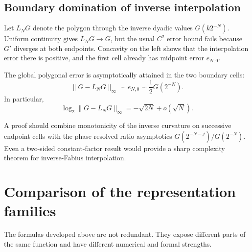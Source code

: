 \documentclass[11pt]{article}
\theoremstyle{definition}
\theoremstyle{remark}
\begin{document}
\subsection{Boundary domination of inverse interpolation}

Let $L_NG$ denote the polygon through the inverse dyadic values
$G(k2^{-N})$.  Uniform continuity gives $L_NG\to G$, but the usual $C^2$
error bound fails because $G'$ diverges at both endpoints.  Concavity on the
left shows that the interpolation error there is positive, and the first cell
already has midpoint error $e_{N,0}$.

\begin{conjecture}
\label{p3:conj:G-interpolation}
The global polygonal error is asymptotically attained in the two boundary
cells:
\begin{equation}\label{p3:eq:G-interpolation-conj}
 \|G-L_NG\|_\infty
 \sim e_{N,0}
 \sim\frac12G(2^{-N}).
\end{equation}
In particular,
\begin{equation}\label{p3:eq:G-interpolation-rate}
 \log_2\|G-L_NG\|_\infty
 =-\sqrt{2N}+o(\sqrt N).
\end{equation}
\end{conjecture}

A proof should combine monotonicity of the inverse curvature on successive
endpoint cells with the phase-resolved ratio asymptotics
$G(2^{-N-j})/G(2^{-N})$.  Even a two-sided constant-factor result would provide
a sharp complexity theorem for inverse-Fabius interpolation.

\section{Comparison of the representation families}
\label{p3:sec:comparison}

The formulas developed above are not redundant.  They expose different parts
of the same function and have different numerical and formal strengths.
\end{document}
